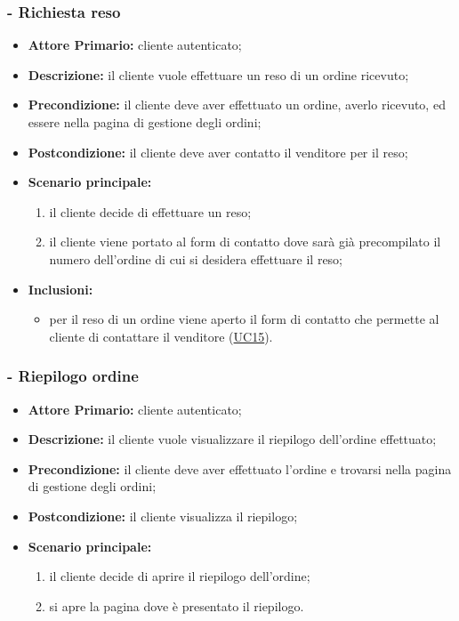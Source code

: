 \subsubsection{ - Richiesta reso}
\begin{itemize}
    \item \textbf{Attore Primario:} cliente autenticato;
    \item \textbf{Descrizione:} il cliente vuole effettuare un reso di un ordine ricevuto;
    \item \textbf{Precondizione:} il cliente deve aver effettuato un ordine, averlo ricevuto, ed essere nella pagina di gestione degli ordini;
    \item \textbf{Postcondizione:} il cliente deve aver contatto il venditore per il reso;
    \item \textbf{Scenario principale:}
          \begin{enumerate}
              \item il cliente decide di effettuare un reso;
              \item il cliente viene portato al form di contatto dove sarà già precompilato il numero dell'ordine di cui si desidera effettuare il reso;
          \end{enumerate}
    \item \textbf{Inclusioni:}
          \begin{itemize}
              \item per il reso di un ordine viene aperto il form di contatto che permette al cliente di contattare il venditore (\hyperref[UC15]{UC15}).
          \end{itemize}
\end{itemize}

\stepsubUserCase
\subsubsection{ - Riepilogo ordine}
\begin{itemize}
    \item \textbf{Attore Primario:} cliente autenticato;
    \item \textbf{Descrizione:} il cliente vuole visualizzare il riepilogo dell'ordine effettuato;
    \item \textbf{Precondizione:} il cliente deve aver effettuato l'ordine e trovarsi nella pagina di gestione degli ordini;
    \item \textbf{Postcondizione:} il cliente visualizza il riepilogo;
    \item \textbf{Scenario principale:}
          \begin{enumerate}
              \item il cliente decide di aprire il riepilogo dell'ordine;
              \item si apre la pagina dove è presentato il riepilogo.
          \end{enumerate}
\end{itemize}

